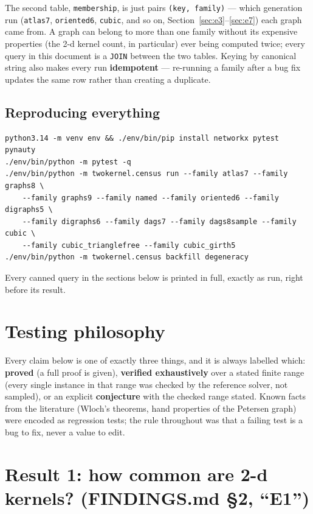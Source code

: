 \documentclass[11pt]{article}
\theoremstyle{plain}
\theoremstyle{definition}
\theoremstyle{remark}
\begin{document}
The second table, \texttt{membership}, is just pairs \texttt{(key, family)} — which
generation run (\texttt{atlas7}, \texttt{oriented6}, \texttt{cubic}, and so on,
Section~\ref{sec:e3}--\ref{sec:e7}) each graph came from. A graph can belong to more
than one family without its expensive properties (the 2-d kernel count, in particular)
ever being computed twice; every query in this document is a \texttt{JOIN} between the
two tables. Keying by canonical string also makes every run \textbf{idempotent} —
re-running a family after a bug fix updates the same row rather than creating a
duplicate.

\subsection{Reproducing everything}

\begin{verbatim}
python3.14 -m venv env && ./env/bin/pip install networkx pytest pynauty
./env/bin/python -m pytest -q
./env/bin/python -m twokernel.census run --family atlas7 --family graphs8 \
    --family graphs9 --family named --family oriented6 --family digraphs5 \
    --family digraphs6 --family dags7 --family dags8sample --family cubic \
    --family cubic_trianglefree --family cubic_girth5
./env/bin/python -m twokernel.census backfill degeneracy
\end{verbatim}
Every canned query in the sections below is printed in full, exactly as run, right
before its result.

\section{Testing philosophy}

Every claim below is one of exactly three things, and it is always labelled which:
\textbf{proved} (a full proof is given), \textbf{verified exhaustively} over a stated
finite range (every single instance in that range was checked by the reference
solver, not sampled), or an explicit \textbf{conjecture} with the checked range
stated. Known facts from the literature (Wloch's theorems, hand properties of the
Petersen graph) were encoded as regression tests; the rule throughout was that a
failing test is a bug to fix, never a value to edit.

\section{Result 1: how common are 2-d kernels? (FINDINGS.md \S2, ``E1'')}
\label{sec:e1}
\end{document}
